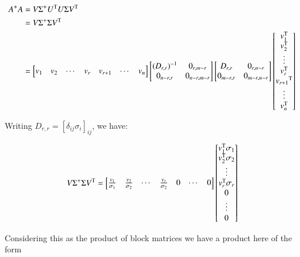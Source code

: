 \begin{align*}
A^{+} A 
&= V \Sigma^{+} U^{\text{T}} U \Sigma V^{\text{T}} \\
&= V \Sigma^{+} \Sigma V^{\text{T}} \\
&=
\begin{bmatrix}
v_1 & v_2 & \cdots & v_r & v_{r+1} & \cdots & v_n \\
\end{bmatrix}
\begin{bmatrix}
(D_{r,r})^{-1} & 0_{r,m-r} \\
0_{n-r,r} & 0_{n-r,m-r} \\
\end{bmatrix}
\begin{bmatrix}
D_{r,r} & 0_{r,n-r} \\
0_{m-r,r} & 0_{m-r,n-r} \\
\end{bmatrix}
\begin{bmatrix}
v_1^{\text{T}} \\ v_2^{\text{T}} \\ \vdots \\ v_r^{\text{T}} \\ {v_{r+1}}^{\text{T}} \\ \vdots \\ v_n^{\text{T}} \\
\end{bmatrix}
\end{align*}

Writing $D_{r,r} = [\delta_{ij}\sigma_i]_{ij}$, we have:

\begin{equation}\label{eqn:mpInvRough:VIrVt}
V \Sigma^{+} \Sigma V^{\text{T}} 
=
\begin{bmatrix}
\frac{v_1}{\sigma_1} & \frac{v_2}{\sigma_2} & \cdots & \frac{v_r}{\sigma_2} & 0 & \cdots & 0 
\end{bmatrix}
\begin{bmatrix}
v_1^{\text{T}} \sigma_1 \\ v_2^{\text{T}} \sigma_2 \\ \vdots \\ v_r^{\text{T}} \sigma_r \\ 0 \\ \vdots \\ 0 \\
\end{bmatrix}
\end{equation}

Considering this as the product of block matrices we have a product here of the form

